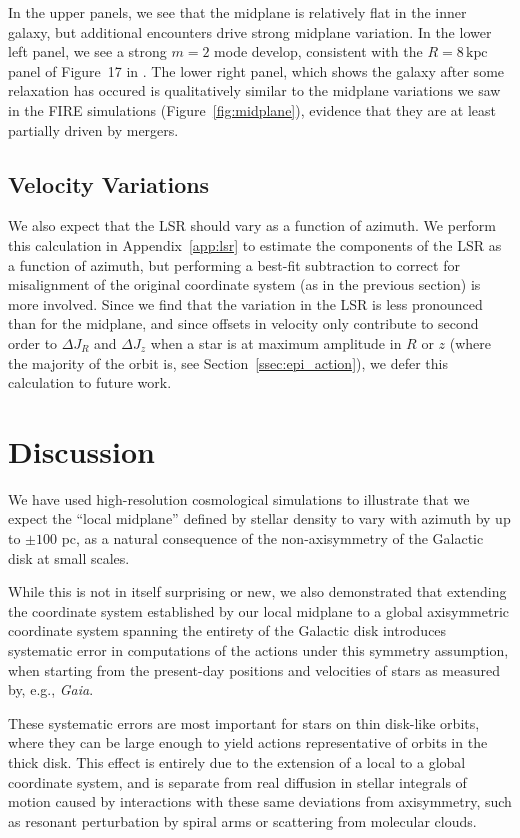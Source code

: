 \documentclass[twocolumn]{aastex62}
\newcommand{\kpc}{\text{kpc}}
\begin{document}
In the upper panels, we see that the midplane is relatively flat in the inner
galaxy, but additional encounters drive strong midplane variation. In the
lower left panel, we see a strong $m=2$ mode develop, consistent with the
$R=8\,\kpc$ panel of Figure~17 in \citet{2018MNRAS.481..286L}. The lower right
panel, which shows the galaxy after some relaxation has occured is
qualitatively similar to the midplane variations we saw in the FIRE
simulations (Figure~\ref{fig:midplane}), evidence that they are at least
partially driven by mergers.

\subsection{Velocity Variations} \label{ssec:lsr_var}
We also expect that the LSR should vary as a function of azimuth. We perform
this calculation in Appendix~\ref{app:lsr} to estimate the components of the
LSR as a function of azimuth, but performing a best-fit subtraction to correct
for misalignment of the original coordinate system (as in the previous
section) is more involved. Since we find that the variation in the LSR is less
pronounced than for the midplane, and since offsets in velocity only
contribute to second order to $\Delta J_R$ and $\Delta J_z$ when a star is at
maximum amplitude in $R$ or $z$ (where the majority of the orbit is, see
Section~\ref{ssec:epi_action}), we defer this calculation to future work.

\section{Discussion} \label{sec:discussion} 
We have used high-resolution cosmological simulations to illustrate that we
expect the ``local midplane'' defined by stellar density to vary with azimuth
by up to $\pm 100$ pc, as a natural consequence of the non-axisymmetry of the
Galactic disk at small scales.

While this is not in itself surprising or new, we also demonstrated that
extending the coordinate system established by our local midplane to a global
axisymmetric coordinate system spanning the entirety of the Galactic disk
introduces systematic error in computations of the actions under this symmetry
assumption, when starting from the present-day positions and velocities of
stars as measured by, e.g., \emph{Gaia}.

These systematic errors are most important for stars on thin disk-like orbits,
where they can be large enough to yield actions representative of orbits in
the thick disk. This effect is entirely due to the extension of a local to a
global coordinate system, and is separate from real diffusion in stellar
integrals of motion caused by interactions with these same deviations from
axisymmetry, such as resonant perturbation by spiral arms or scattering from
molecular clouds.
\end{document}
